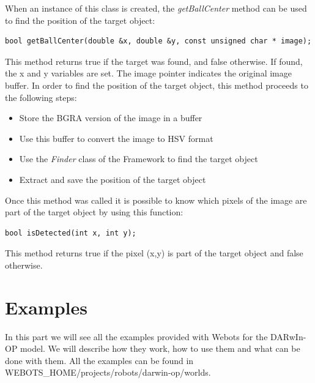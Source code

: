 \documentclass[a4paper, 12pt]{article}  		%
\begin{document}
\newpage
When an instance of this class is created, the \textit{getBallCenter} method can be used to find the position of the target object:\\

\lstset{language=c++} 
\lstset{commentstyle=\textit} 
\begin{lstlisting} 
bool getBallCenter(double &x, double &y, const unsigned char * image);
\end{lstlisting}
 
This method returns true if the target was found, and false otherwise. If found, the x and y variables are set. The image pointer indicates the original image buffer. In order to find the position of the target object, this method proceeds to the following steps:\\
\begin{itemize}
\item Store the BGRA version of the image in a buffer
\item Use this buffer to convert the image to HSV format
\item Use the \textit{Finder} class of the Framework to find the target object
\item Extract and save the position of the target object
\end{itemize}

Once this method was called it is possible to know which pixels of the image are part of the target object by using this function:\\

\lstset{language=c++} 
\lstset{commentstyle=\textit} 
\begin{lstlisting} 
bool isDetected(int x, int y);
\end{lstlisting}

This method returns true if the pixel (x,y) is part of the target object and false otherwise.\\



\newpage
\section{Examples}

In this part we will see all the examples provided with Webots for the DARwIn-OP model. We will describe how they work, how to use them and what can be done with them. All the examples can be found in WEBOTS\_HOME/projects/robots/darwin-op/worlds.\\
\end{document}
